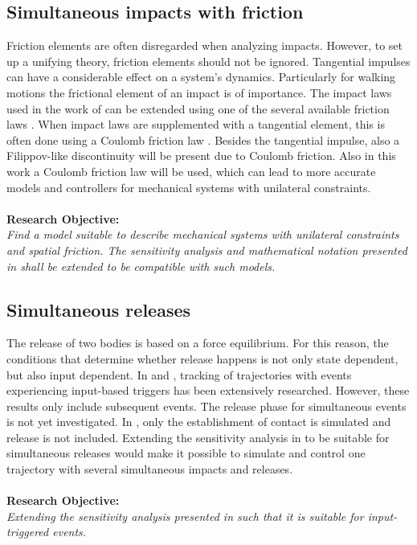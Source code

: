 \documentclass[../DC2017114Bouma.tex]{subfiles}
\begin{document}
\subsection*{Simultaneous impacts with friction}
Friction elements are often disregarded when analyzing impacts. However, to set up a unifying theory, friction elements should not be ignored. Tangential impulses can have a considerable effect on a system's dynamics. Particularly for walking motions the frictional element of an impact is of importance. The impact laws used in the work of \cite{Chen2018a} can be extended using one of the several available friction laws \cite{Leine2008}. When impact laws are supplemented with a tangential element, this is often done using a Coulomb friction law \cite{Glocker2014a}. Besides the tangential impulse, also a Filippov-like discontinuity will be present due to Coulomb friction. Also in this work a Coulomb friction law will be used, which can lead to more accurate models and controllers for mechanical systems with unilateral constraints.\\\\
\textbf{Research Objective:}\\
\textit{Find a model suitable to describe mechanical systems with unilateral constraints and spatial friction. The sensitivity analysis and mathematical notation presented in \cite{Rijnen2018a} shall be extended to be compatible with such models.}

\subsection*{Simultaneous releases}
The release of two bodies is based on a force equilibrium. For this reason, the conditions that determine whether release happens is not only state dependent, but also input dependent. In \cite{Rijnen2016} and \cite{Rijn2016}, tracking of trajectories with events experiencing input-based triggers has been extensively researched. However, these results only include subsequent events. The release phase for simultaneous events is not yet investigated. In \cite{Chen2018a}, only the establishment of contact is simulated and release is not included. Extending the sensitivity analysis in \cite{Chen2018a} to be suitable for simultaneous releases would make it possible to simulate and control one trajectory with several simultaneous impacts and releases.\\\\
\textbf{Research Objective:}\\
\textit{Extending the sensitivity analysis presented in \cite{Rijnen2018a} such that it is suitable for input-triggered events.}
\end{document}
